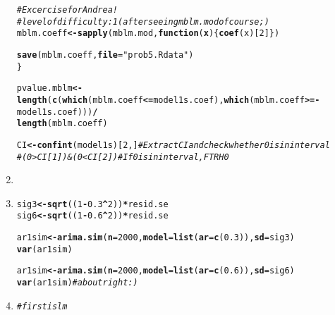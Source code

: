 \documentclass[11pt]{article}\usepackage[]{graphicx}\usepackage[]{color}
\makeatletter
\newcommand{\hlnum}[1]{\textcolor[rgb]{0,0,0}{#1}}%
\newcommand{\hlstr}[1]{\textcolor[rgb]{0,0,0}{#1}}%
\newcommand{\hlcom}[1]{\textcolor[rgb]{0.4,0.4,0.4}{\textit{#1}}}%
\newcommand{\hlopt}[1]{\textcolor[rgb]{0,0,0}{\textbf{#1}}}%
\newcommand{\hlstd}[1]{\textcolor[rgb]{0,0,0}{#1}}%
\newcommand{\hlkwa}[1]{\textcolor[rgb]{0,0,0}{\textbf{#1}}}%
\newcommand{\hlkwb}[1]{\textcolor[rgb]{0,0,0}{\textbf{#1}}}%
\newcommand{\hlkwc}[1]{\textcolor[rgb]{0,0,0}{\textbf{#1}}}%
\newcommand{\hlkwd}[1]{\textcolor[rgb]{0,0,0}{\textbf{#1}}}%
\newenvironment{kframe}{%
 \def\at@end@of@kframe{}%
 \ifinner\ifhmode%
  \def\at@end@of@kframe{\end{minipage}}%
  \begin{minipage}{\columnwidth}%
 \fi\fi%
 \def\FrameCommand##1{\hskip\@totalleftmargin \hskip-\fboxsep
 \colorbox{shadecolor}{##1}\hskip-\fboxsep
     \hskip-\linewidth \hskip-\@totalleftmargin \hskip\columnwidth}%
 \MakeFramed {\advance\hsize-\width
   \@totalleftmargin\z@ \linewidth\hsize
   \@setminipage}}%
 {\par\unskip\endMakeFramed%
 \at@end@of@kframe}
\newenvironment{knitrout}{}{} %
\makeatother
\begin{document}
\begin{enumerate}
\begin{knitrout}
\begin{kframe}
\begin{alltt}
  \hlcom{# Excercise for Andrea!}
  \hlcom{# level of difficulty: 1 (after seeing mblm.mod of course ;) }
  \hlstd{mblm.coeff} \hlkwb{<-} \hlkwd{sapply}\hlstd{(mblm.mod,} \hlkwa{function}\hlstd{(}\hlkwc{x}\hlstd{)\{}\hlkwd{coef}\hlstd{(x)[}\hlnum{2}\hlstd{]\})}

  \hlkwd{save}\hlstd{(mblm.coeff,} \hlkwc{file} \hlstd{=} \hlstr{"prob5.Rdata"}\hlstd{)}
\hlstd{\}}

\hlstd{pvalue.mblm} \hlkwb{<-} \hlkwd{length}\hlstd{(}\hlkwd{c}\hlstd{(}\hlkwd{which}\hlstd{(mblm.coeff}\hlopt{<=}\hlstd{model1s.coef),} \hlkwd{which}\hlstd{(mblm.coeff}\hlopt{>=-}\hlstd{model1s.coef)))} \hlopt{/}
\hlkwd{length}\hlstd{(mblm.coeff)}


\hlstd{CI}\hlkwb{<-}\hlkwd{confint}\hlstd{(model1s)[}\hlnum{2}\hlstd{,]} \hlcom{#Extract CI and check whether 0 is in interval}
\hlcom{#(0>CI[1])&(0<CI[2]) #If 0 is in interval, FTR H0}
\end{alltt}
\end{kframe}
\end{knitrout}
\item%

\item%
\begin{knitrout}\footnotesize
{}\color{fgcolor}\begin{kframe}
\begin{alltt}
\hlstd{sig3} \hlkwb{<-} \hlkwd{sqrt}\hlstd{((}\hlnum{1}\hlopt{-}\hlnum{0.3}\hlopt{^}\hlnum{2}\hlstd{))} \hlopt{*} \hlstd{resid.se}
\hlstd{sig6} \hlkwb{<-} \hlkwd{sqrt}\hlstd{((}\hlnum{1}\hlopt{-}\hlnum{0.6}\hlopt{^}\hlnum{2}\hlstd{))} \hlopt{*} \hlstd{resid.se}

\hlstd{ar1sim}\hlkwb{<-}\hlkwd{arima.sim}\hlstd{(}\hlkwc{n}\hlstd{=}\hlnum{2000}\hlstd{,}\hlkwc{model}\hlstd{=}\hlkwd{list}\hlstd{(}\hlkwc{ar}\hlstd{=}\hlkwd{c}\hlstd{(}\hlnum{0.3}\hlstd{)),}\hlkwc{sd}\hlstd{=sig3)}
\hlkwd{var}\hlstd{(ar1sim)}

\hlstd{ar1sim}\hlkwb{<-}\hlkwd{arima.sim}\hlstd{(}\hlkwc{n}\hlstd{=}\hlnum{2000}\hlstd{,}\hlkwc{model}\hlstd{=}\hlkwd{list}\hlstd{(}\hlkwc{ar}\hlstd{=}\hlkwd{c}\hlstd{(}\hlnum{0.6}\hlstd{)),}\hlkwc{sd}\hlstd{=sig6)}
\hlkwd{var}\hlstd{(ar1sim)} \hlcom{# about right :)}
\end{alltt}
\end{kframe}
\end{knitrout}
\item%
\begin{knitrout}\footnotesize
{}\color{fgcolor}\begin{kframe}
\begin{alltt}
\hlcom{# first is lm}


\end{alltt}
\end{kframe}
\end{knitrout}
\end{enumerate}
\end{document}
